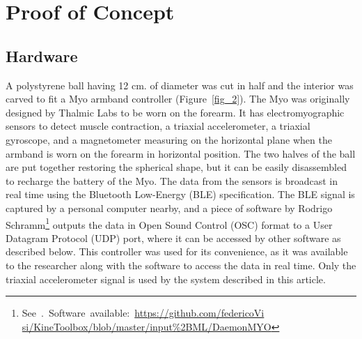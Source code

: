 \documentclass{nime-alternate_MANUSCRIPT} %
\begin{document}
\section{Proof of Concept}

\subsection{Hardware}

A polystyrene ball having 12 cm. of diameter was cut in half and the interior was carved to fit a Myo armband controller (Figure~\ref{fig_2}). The Myo was originally designed by Thalmic Labs to be worn on the forearm. It has electromyographic sensors to detect muscle contraction, a triaxial accelerometer, a triaxial gyroscope, and a magnetometer measuring on the horizontal plane when the armband is worn on the forearm in horizontal position. The two halves of the ball are put together restoring the spherical shape, but it can be easily disassembled to recharge the battery of the Myo. The data from the sensors is broadcast in real time using the Bluetooth Low-Energy (BLE) specification. The BLE signal is captured by a personal computer nearby, and a piece of software by Rodrigo Schramm\footnote{See~\cite{Visi_2017}.~Software~available:~\href{https://github.com/federicoVisi/KineToolbox/blob/master/input\%2BML/DaemonMYO}{https://github.com/federicoVi\\si/KineToolbox/blob/master/input\%2BML/DaemonMYO}} outputs the data in Open Sound Control (OSC) format to a User Datagram Protocol (UDP) port, where it can be accessed by other software as described below. This controller was used for its convenience, as it was available to the researcher along with the software to access the data in real time. Only the triaxial accelerometer signal is used by the system described in this article.
\end{document}
